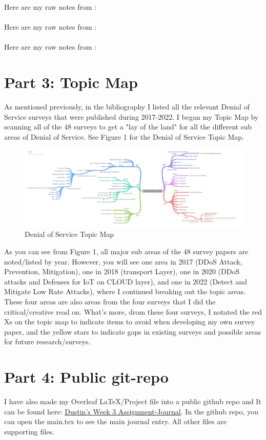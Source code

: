 \documentclass[a4paper]{article}
\begin{document}
Here are my raw notes from \cite{saif2018review}:\\
\\

Here are my raw notes from \cite{salim2020distributed}:\\
\\

Here are my raw notes from \cite{rios2022detection}:\\


\section{Part 3: Topic Map}
As mentioned previously, in the bibliography I listed all the relevant Denial of Service surveys that were published during 2017-2022. I began my Topic Map by scanning all of the 48 surveys to get a "lay of the land" for all the different sub areas of Denial of Service. See Figure 1 for the Denial of Service Topic Map.

\begin{figure}[H]
\centering
\includegraphics[width=1\textwidth]{Denial_of_Service_DoS.pdf}
\caption{\label{fig:DOS}Denial of Service Topic Map}
\end{figure}

 As you can see from Figure 1, all major sub areas of the 48 survey papers are noted/listed by year. However, you will see one area in 2017 (DDoS Attack, Prevention, Mitigation), one in 2018 (transport Layer), one in 2020 (DDoS attacks and Defenses for IoT on CLOUD layer), and one in 2022 (Detect and Mitigate Low Rate Attacks), where I continued breaking out the topic areas. These four areas are also areas from the four surveys that I did the critical/creative read on. What's more, drom these four surveys, I notated the red Xs on the topic map to indicate items to avoid when developing my own survey paper, and the yellow stars to indicate gaps in existing surveys and possible areas for future research/surveys.

\section{Part 4: Public git-repo}

I have also made my Overleaf LaTeX/Project file into a public github repo and It can be found here: \href{https://github.com/dustbonetru/Week-3-Assignment-Journal}{Dustin's Week 3 Assignment-Journal}. In the github repo, you can open the main.tex to see the main journal entry. All other files are supporting files.

\nocite{*}


\end{document}
